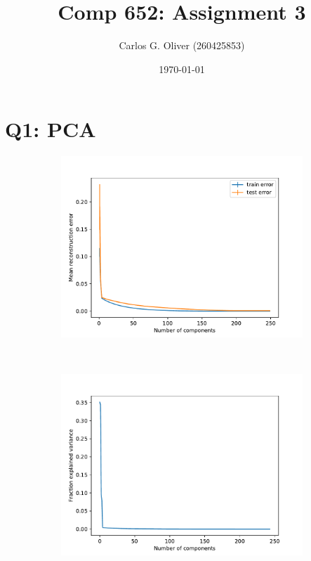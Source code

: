 \documentclass[11pt]{amsart}
\title{Comp 652: Assignment 3}
\author{Carlos G. Oliver (260425853)}
\date{\today}                                           %
\begin{document}
\maketitle

\section{Q1: PCA}

\begin{figure}[h]
\centering
\begin{subfigure}{0.5\textwidth}
\includegraphics[width=\textwidth]{reconstruction.pdf}
\caption{}
\label{subfig:rfam_count}
\end{subfigure}
~
\begin{subfigure}{0.46\textwidth}
\includegraphics[width=\textwidth]{var.pdf}
\caption{}
\label{subfig:rfam_stats}
\end{subfigure}

\caption{}
\label{fig:rfam}
\end{figure}
\end{document}
